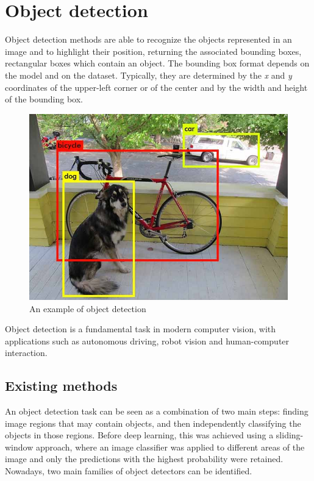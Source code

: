 \documentclass[%
    corpo=12pt,
    twoside,
    stile=classica,   
    tipotesi=magistrale,
    evenboxes,
    english,
	numerazioneromana,
]{toptesi}
\begin{document}
\section{Object detection}\label{sec:detection}
Object detection methods are able to recognize the objects represented in an image and to highlight their position, returning the associated bounding boxes, rectangular boxes which contain an object. The bounding box format depends on the model and on the dataset. Typically, they are determined by the \textit{x} and \textit{y} coordinates of the upper-left corner
or of the center
and by the width and height of the bounding box.

\begin{figure}[ht]
	\centering
	\includegraphics[width=.65\textwidth]{imgs/yolo_detection.png}
	\caption{An example of object detection\cite{redmon2016look}}
\end{figure}

Object detection is a fundamental task in modern computer vision, with applications such as autonomous driving, robot vision and human-computer interaction.

\subsection{Existing methods}\label{sec:detectors}
An object detection task can be seen as a combination of two main steps: finding image regions that may contain objects, and then independently classifying the objects in those regions. Before deep learning, this was achieved using a sliding-window approach, where an image classifier was applied to different areas of the image and only the predictions with the highest probability were retained. Nowadays, two main families of object detectors can be identified.
\end{document}
